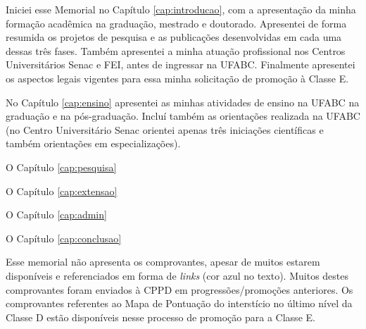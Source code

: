 Iniciei esse Memorial no Capítulo \ref{cap:introducao}, com a apresentação da minha formação acadêmica na graduação, mestrado e doutorado. Apresentei de forma resumida os projetos de pesquisa e as publicações desenvolvidas em cada uma dessas três fases. Também apresentei a minha atuação profissional nos Centros Universitários Senac e FEI, antes de ingressar na UFABC. Finalmente apresentei os aspectos legais vigentes para essa minha solicitação de promoção à Classe E.

No Capítulo \ref{cap:ensino} apresentei as minhas atividades de ensino na UFABC na graduação e na pós-graduação. Incluí também as orientações realizada na UFABC (no Centro Universitário Senac orientei apenas três iniciações científicas e também orientações em especializações).

O Capítulo \ref{cap:pesquisa}

O Capítulo \ref{cap:extensao}

O Capítulo \ref{cap:admin}

O Capítulo \ref{cap:conclusao}


Esse memorial não apresenta os comprovantes, apesar de muitos estarem disponíveis e referenciados em forma de \textit{links} (cor azul no texto). Muitos destes comprovantes foram enviados à CPPD em progressões/promoções anteriores. Os comprovantes referentes ao Mapa de Pontuação do interstício no último nível da Classe D estão disponíveis nesse processo de promoção para a Classe E.



